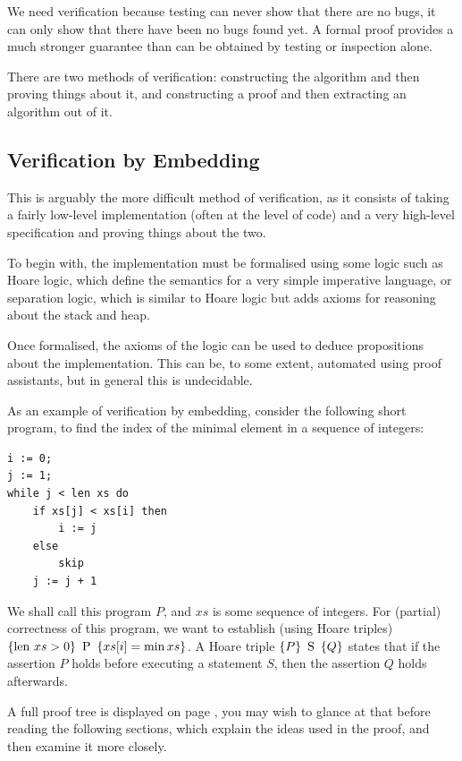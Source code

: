 We need verification because testing can never show that there are no
bugs, it can only show that there have been no bugs found yet. A
formal proof provides a much stronger guarantee than can be obtained
by testing or inspection alone.

There are two methods of verification: constructing the algorithm and
then proving things about it, and constructing a proof and then
extracting an algorithm out of it.

\subsection{Verification by Embedding}
\label{sec:lit-verification-embedding}

This is arguably the more difficult method of verification, as it
consists of taking a fairly low-level implementation (often at the
level of code) and a very high-level specification and proving things
about the two.

To begin with, the implementation must be formalised using some logic
such as Hoare logic\cite{Hoare69}, which define the semantics for a
very simple imperative language, or separation logic\cite{Reynolds02},
which is similar to Hoare logic but adds axioms for reasoning about
the stack and heap.

Once formalised, the axioms of the logic can be used to deduce
propositions about the implementation. This can be, to some extent,
automated using \glspl{proof assistant}, but in general this is
undecidable.

\begin{example}
  \label{exmpl:lit-embedding}
  As an example of \gls{verification by embedding}, consider the
  following short program, to find the index of the minimal element in
  a sequence of integers:

\begin{verbatim}
i := 0;
j := 1;
while j < len xs do
    if xs[j] < xs[i] then
        i := j
    else
        skip
    j := j + 1
\end{verbatim}

  We shall call this program $P$, and $xs$ is some sequence of
  integers. For (partial) correctness of this program, we want to
  establish (using Hoare triples) $\left\{\mathrm{len}~ xs > 0\right\}\ \mbox{P}\ \left\{xs[i] =
    \min xs\right\}$. A Hoare triple $\left\{P\right\}\ \mbox{S}\ \left\{Q\right\}$ states that if the
  assertion $P$ holds before executing a statement $S$, then the
  assertion $Q$ holds afterwards.

  A full proof tree is displayed on page
  \pageref{sec:lit-verification-embedding-example}, you may wish to
  glance at that before reading the following sections, which explain
  the ideas used in the proof, and then examine it more closely.
\end{example}

